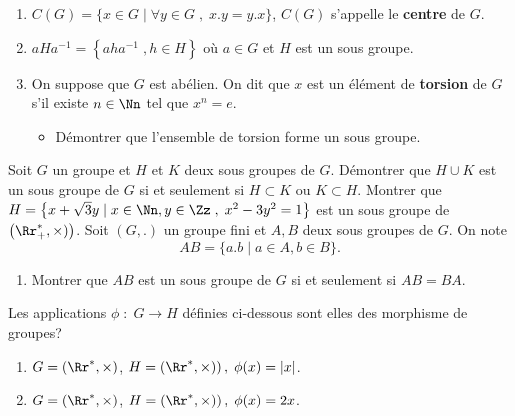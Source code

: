 \documentclass[10pt, a4paper, twocolumn]{homework}
\begin{document}
\begin{enumerate}
  \item $C(G) = \{x\in G\;|\; \forall y \in G\;,\; x.y = y.x\} $, $C(G)$
    s'appelle le \textbf{centre}  de $G$.
  \item $aHa^{-1} = \left\{a h a^{-1}\;, h\in H\right\}$ où $a\in G$ et $H$ est
    un sous groupe.
  \item On suppose que $G$ est abélien. On dit que $x$ est un élément  de
    \textbf{torsion} de $G$ s'il existe $n\in \Nn$ tel que $x^n=e$.

    \begin{itemize}
      \item Démontrer que l'ensemble de torsion forme un sous groupe.
    \end{itemize}
\end{enumerate}
Soit $G$ un groupe et $H$ et $K$ deux sous groupes de $G$. Démontrer que $H\cup
K$ est un sous groupe de $G$ si et seulement si $H\subset K$ ou $K\subset H$.
Montrer que $H = \left\{x+ \sqrt{3}y\;|\; x\in\Nn, y\in\Zz\;,\; x^2 -3y^2=1
\right\}$ est un sous groupe de $\left(\Rr_+^{*},\times)\right)$.
Soit $\left(G, .\right)$ un groupe fini et $A,B$ deux sous groupes de $G$. On
note
\begin{equation*}
  AB = \{a.b\;|\; a\in A, b\in B\}.
\end{equation*}

\begin{enumerate}
  \item Montrer  que $AB$ est un sous groupe de $G$ si et seulement si $AB =
    BA$.
\end{enumerate}
Les applications $\phi\;:\; G\longrightarrow H$ définies ci-dessous sont elles
des morphisme de groupes?

\begin{enumerate}
  \item $G = \left(\Rr^{*},\times\right)$, $H = \left(\Rr^{*},\times)\right),\;
    \phi(x) = \vert x\vert$.
  \item $G = \left(\Rr^{*},\times\right)$, $H = \left(\Rr^{*},\times)\right),\;
    \phi(x) = 2x$.
\end{enumerate}
\end{document}
